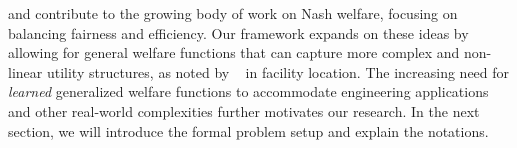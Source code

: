 \cite{barman2024compatibility} and \cite{lam2023nash} contribute to the growing body of work on Nash welfare, focusing on balancing fairness and efficiency. Our framework expands on these ideas by allowing for general welfare functions that can capture more complex and non-linear utility structures, as noted by ~\cite{Drezner2001} in facility location. The increasing need for \textit{learned} generalized welfare functions \cite{pardeshi2024learning,balcan2014learning,zadimoghaddam2012efficiently} to accommodate engineering applications and other real-world complexities further motivates our research. In the next section, we will introduce the formal problem setup and explain the notations.




